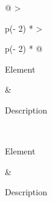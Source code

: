 
\begin{longtable}[]{@{}
  >{\raggedright\arraybackslash}p{(\columnwidth - 2\tabcolsep) * }
  >{\raggedright\arraybackslash}p{(\columnwidth - 2\tabcolsep) * }@{}}
\toprule\noalign{}


\begin{minipage}[b]{\linewidth}\raggedright
Element
\end{minipage} & \begin{minipage}[b]{\linewidth}\raggedright
Description
\end{minipage} \\
\midrule\noalign{}
\endfirsthead
\toprule\noalign{}


\begin{minipage}[b]{\linewidth}\raggedright
Element
\end{minipage} & \begin{minipage}[b]{\linewidth}\raggedright
Description
\end{minipage} \\
\midrule\noalign{}



\end{longtable}
